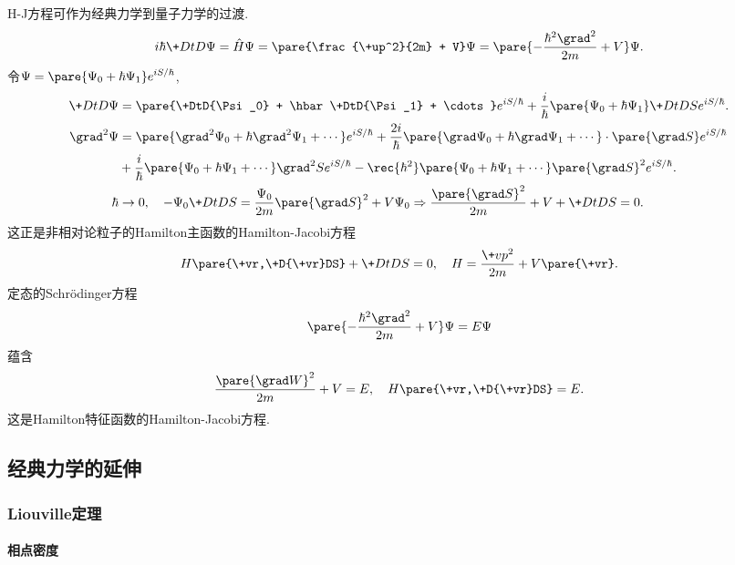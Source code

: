 \documentclass[../LectureNotes.tex]{subfiles}
\begin{document}
H-J方程可作为经典力学到量子力学的过渡.
\[ i\hbar \+DtD\Psi = \hat H \Psi = \pare{\frac{\+up^2}{2m} + V}\Psi = \pare{-\frac{\hbar^2 \laplacian}{2m} + V}\Psi. \]
令$\displaystyle \Psi = \pare{\Psi_0 + \hbar \Psi_1} e^{iS/\hbar}$,
\begin{align*}
    \+DtD\Psi &= \pare{\+DtD{\Psi_0} + \hbar \+DtD{\Psi_1} + \cdots} e^{iS/\hbar} + \frac{i}{\hbar} \pare{\Psi_0 + \hbar \Psi_1} \+DtDS e^{iS/\hbar}. \\
    \laplacian \Psi &= \pare{\laplacian \Psi_0 + \hbar\laplacian \Psi_1 + \cdots} e^{iS/\hbar} + \frac{2i}{\hbar}\pare{\grad \Psi_0 + \hbar \grad \Psi_1 + \cdots} \cdot \pare{\grad S} e^{iS/\hbar} \\
    &+ \frac{i}{\hbar}\pare{\Psi_0 + \hbar\Psi_1 + \cdots} \laplacian S e^{iS/\hbar} - \rec{\hbar^2}\pare{\Psi_0 + \hbar\Psi_1 + \cdots}\pare{\grad S}^2 e^{iS/\hbar}. \\
    \hbar & \rightarrow 0,\quad -\Psi_0 \+DtDS = \frac{\Psi_0}{2m}\pare{\grad S}^2 + V\Psi_0 \Rightarrow \frac{\pare{\grad S}^2}{2m} + V + \+DtDS = 0.
\end{align*}
这正是非相对论粒子的Hamilton主函数的Hamilton-Jacobi方程
\[ H\pare{\+vr,\+D{\+vr}DS} + \+DtDS = 0,\quad H = \frac{\+vp^2}{2m} + V\pare{\+vr}. \]
定态的Schr\"odinger方程
\[ \pare{-\frac{\hbar^2\laplacian}{2m} + V}\Psi = E\Psi \]
蕴含
\[ \frac{\pare{\grad W}^2}{2m} + V = E,\quad H\pare{\+vr,\+D{\+vr}DS} = E. \]
这是Hamilton特征函数的Hamilton-Jacobi方程.




\subsection{经典力学的延伸} %
\label{sub:经典力学的延伸}

\subsubsection{Liouville定理} %
\label{ssub:liouville定理}

\paragraph{相点密度} %
\label{par:相点密度}
\end{document}
